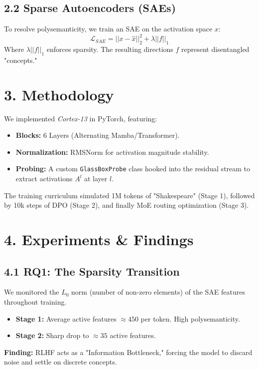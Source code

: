 \documentclass[12pt, a4paper]{article}
\begin{document}
\subsection{2.2 Sparse Autoencoders (SAEs)}
To resolve polysemanticity, we train an SAE on the activation space $x$:
\begin{equation}
    \mathcal{L}_{SAE} = ||x - \hat{x}||^2_2 + \lambda ||f||_1
\end{equation}
Where $\lambda ||f||_1$ enforces sparsity. The resulting directions $f$ represent disentangled "concepts."

\section{3. Methodology}
We implemented \textit{Cortex-13} in PyTorch, featuring:
\begin{itemize}
    \item \textbf{Blocks:} 6 Layers (Alternating Mamba/Transformer).
    \item \textbf{Normalization:} RMSNorm for activation magnitude stability.
    \item \textbf{Probing:} A custom \texttt{GlassBoxProbe} class hooked into the residual stream to extract activations $A^l$ at layer $l$.
\end{itemize}

The training curriculum simulated 1M tokens of "Shakespeare" (Stage 1), followed by 10k steps of DPO (Stage 2), and finally MoE routing optimization (Stage 3).

\section{4. Experiments \& Findings}

\subsection{4.1 RQ1: The Sparsity Transition}
We monitored the $L_0$ norm (number of non-zero elements) of the SAE features throughout training.
\begin{itemize}
    \item \textbf{Stage 1:} Average active features $\approx 450$ per token. High polysemanticity.
    \item \textbf{Stage 2:} Sharp drop to $\approx 35$ active features.
\end{itemize}
\textbf{Finding:} RLHF acts as a "Information Bottleneck," forcing the model to discard noise and settle on discrete concepts.
\end{document}
